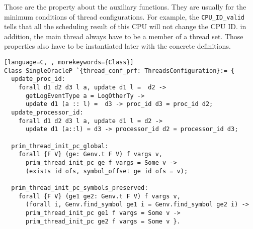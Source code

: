 Those are the property about the auxiliary functions. 
They are usually for the minimum conditions of 
thread configurations. 
For example, 
the \lstinline$CPU_ID_valid$ tells that all the scheduling result of this CPU 
will not change the CPU ID. 
in addition, 
the main thread always have to be a member of a thread set. 
Those properties also have to be instantiated later with the concrete definitions.

%
%
%
%
%
%
%
%       
%
\begin{lstlisting}[language=C, , morekeywords={Class}]
Class SingleOracleP `{thread_conf_prf: ThreadsConfiguration}:= {
  update_proc_id:
    forall d1 d2 d3 l a, update d1 l =  d2 ->
      getLogEventType a = LogOtherTy ->
      update d1 (a :: l) =  d3 -> proc_id d3 = proc_id d2;
  update_processor_id:
    forall d1 d2 d3 l a, update d1 l = d2 -> 
      update d1 (a::l) = d3 -> processor_id d2 = processor_id d3;
       
  prim_thread_init_pc_global:
    forall {F V} (ge: Genv.t F V) f vargs v,
      prim_thread_init_pc ge f vargs = Some v ->
      (exists id ofs, symbol_offset ge id ofs = v);

  prim_thread_init_pc_symbols_preserved:
    forall {F V} (ge1 ge2: Genv.t F V) f vargs v,
      (forall i, Genv.find_symbol ge1 i = Genv.find_symbol ge2 i) ->
      prim_thread_init_pc ge1 f vargs = Some v ->
      prim_thread_init_pc ge2 f vargs = Some v }.
\end{lstlisting}
